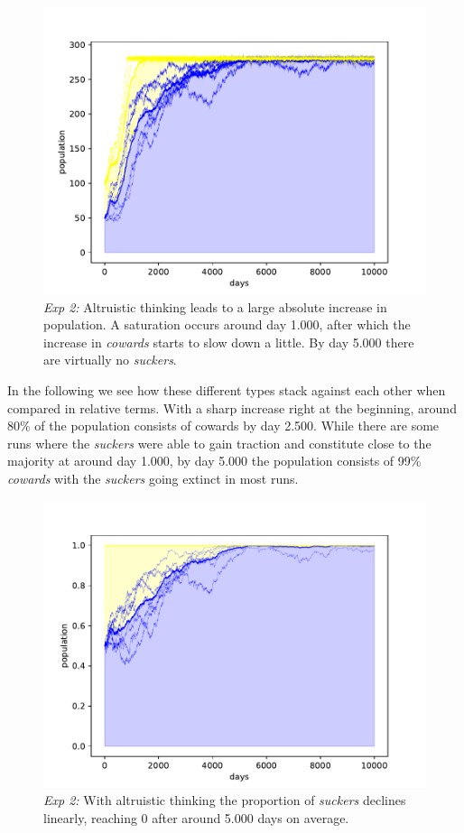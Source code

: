 \documentclass[sigconf]{acmart}
\newcommand{\cowards}{\textit{cowards}\xspace}
\newcommand{\suckers}{\textit{suckers}\xspace}
\begin{document}
    \begin{figure}
        \includegraphics[width=\columnwidth]{figures/exp2_sucker}
        \caption{\textit{Exp 2:} Altruistic thinking leads to a large absolute increase in population.
        A saturation occurs around day 1.000, after which the increase in \cowards starts to slow down a little.
        By day 5.000 there are virtually no \suckers.}
        \label{fig:exp2_sucker}
    \end{figure}

    In the following  we see how these different types stack against each other when compared in relative terms.
    With a sharp increase right at the beginning, around $80\%$ of the population consists of cowards by day 2.500.
    While there are some runs where the \suckers were able to gain traction and constitute close to the majority at around day 1.000, by day 5.000 the population consists of 99\% \cowards with the \suckers going extinct in most runs.


    \begin{figure}
        \includegraphics[width=\columnwidth]{figures/exp2_sucker_rel}
        \caption{\textit{Exp 2:} With altruistic thinking the proportion of \suckers declines linearly, reaching 0 after around 5.000 days on average.}
        \label{fig:exp2_sucker_rel}
    \end{figure}
\end{document}
